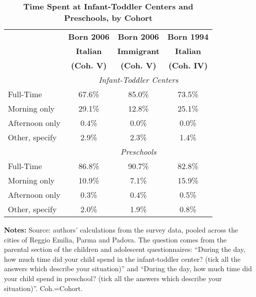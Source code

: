 \begin{table}[ht!]
\caption{\textbf{Time Spent at Infant-Toddler Centers and Preschools, by Cohort}}
\label{tab:Time}
\begin{center}
\footnotesize
\begin{tabular}{ l c c c }
\hline\hline
& \textbf{Born 2006} & \textbf{Born 2006} & \textbf{Born 1994}\\
& \textbf{Italian} & \textbf{Immigrant} & \textbf{Italian}\\
& \textbf{(Coh. V)} & \textbf{(Coh. V)} & \textbf{(Coh. IV)}\\
\hline
&\multicolumn{3}{c}{\textit{Infant-Toddler Centers}}\\
\hline
Full-Time      & 67.6\% & 85.0\% & 73.5\% \\[0.2em]
Morning only   & 29.1\% & 12.8\% & 25.1\% \\[0.2em]
Afternoon only &  0.4\% &  0.0\% &  0.0\% \\[0.2em]
Other, specify &  2.9\% &  2.3\% &  1.4\% \\
\hline
&\multicolumn{3}{c}{\textit{Preschools}}\\
\hline
Full-Time      & 86.8\% & 90.7\% & 82.8\%\\[0.2em]
Morning only   & 10.9\% &  7.1\% & 15.9\%\\[0.2em]
Afternoon only &  0.3\% &  0.4\% &  0.5\%\\[0.2em]
Other, specify &  2.0\% &  1.9\% &  0.8\%\\
\hline
\end{tabular}
\end{center}
\begin{flushleft}
\tiny{{\bfseries Notes:} Source: authors' calculations from the survey data, pooled across the cities of Reggio Emilia, Parma and Padova. The question comes from the parental section of the children and adolescent questionnaires: ``During the day, how much time did your child spend in the infant-toddler center? (tick all the answers which describe your situation)'' and ``During the day, how much time did your child spend in preschool? (tick all the answers which describe your situation)''. Coh.=Cohort.}
\end{flushleft}
\end{table}


